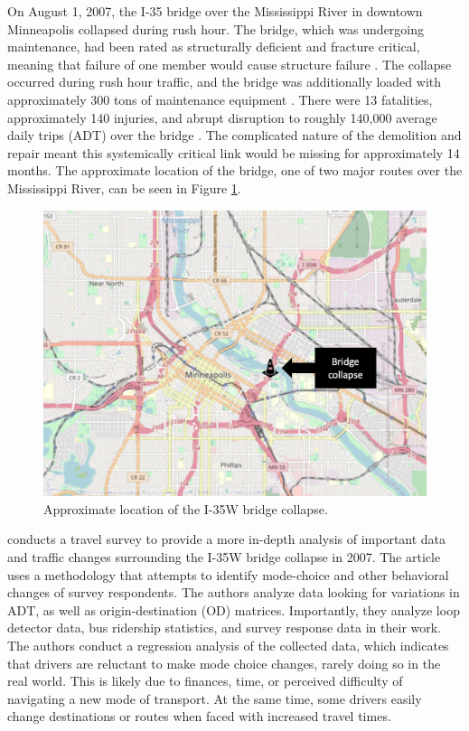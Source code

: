 On August 1, 2007, the I-35 bridge over the Mississippi River in downtown
Minneapolis collapsed
during rush hour. The bridge, which was undergoing maintenance, had been
rated as structurally
deficient and fracture critical, meaning that failure of one member would
cause structure
failure \citep{schaper2017}. The collapse occurred during rush hour traffic, and the bridge
was additionally loaded
with approximately 300 tons of maintenance equipment \citep{schaper2017}.
There were 13
fatalities,
approximately 140 injuries, and abrupt disruption to roughly 140,000
average daily trips (ADT)
over the bridge \citep{zhu2010}. The complicated nature of the demolition
and repair meant
this systemically critical link would be missing for approximately 14
months. The approximate
location of the bridge, one of two major routes over the Mississippi
River, can be seen in Figure \ref{fig:i35}.

\begin{figure}

{\centering \includegraphics[width=0.75\linewidth]{figures/chapter2/I-35W.png}

}

\caption{Approximate location of the I-35W bridge collapse.}\label{fig:i35}
\end{figure}

\citet{zhu2010} conducts a travel survey to provide a more in-depth
analysis of important data
and traffic changes surrounding the I-35W bridge collapse in 2007. The
article uses a methodology
that attempts to identify mode-choice and other behavioral changes of
survey respondents. The
authors analyze data looking for variations in ADT, as well as origin-destination (OD) matrices.
Importantly, they analyze loop detector data, bus ridership statistics, and survey response data in their work. The
authors conduct a regression analysis of the collected data,
which indicates that drivers are reluctant to make mode choice changes,
rarely doing so in the real world. This is
likely due to finances, time, or perceived difficulty of
navigating a new mode of
transport. At the same time, some drivers easily change destinations or routes when faced
with increased travel
times.

